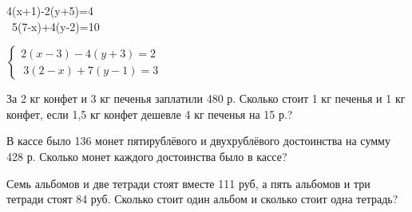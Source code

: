 \begin{class}[number=5]
\begin{listofex}
\begin{tasks}
\begin{cases}
				4(x+1)-2(y+5)=4\\\ 5(7-x)+4(y-2)=10
			\end{cases} \)
			\task \( \begin{cases}
				2(x-3)-4(y+3)=2\\\ 3(2-x)+7(y-1)=3
			\end{cases} \)
		\end{tasks}
		\item  За 2 кг конфет и 3 кг печенья заплатили 480 р. Сколько стоит 1 кг печенья  и 1 кг конфет, если 1,5 кг конфет дешевле 4 кг печенья на 15 р.?
		\item  В кассе было 136 монет пятирублёвого и  двухрублёвого достоинства на сумму 428 р. Сколько монет каждого достоинства было в кассе?
		\item Семь альбомов и две тетради стоят вместе 111 руб, а пять альбомов и три тетради стоят 84 руб. Сколько стоит один альбом и сколько стоит одна тетрадь?
	\end{listofex}
\end{class}

